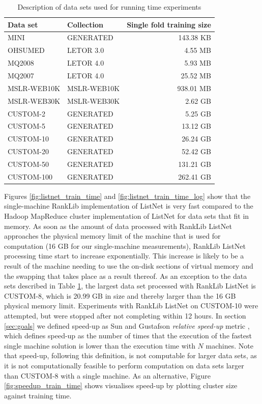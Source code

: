 \begin{table}
\centering
\begin{tabular}{p{3.4cm}p{3.4cm}r}\toprule
Data set & Collection & Single fold training size \\
\midrule
MINI		& GENERATED		  & 143.38 KB\\
OHSUMED     & LETOR 3.0       &   4.55 MB\\
MQ2008      & LETOR 4.0       &   5.93 MB\\
MQ2007      & LETOR 4.0       &  25.52 MB\\
MSLR-WEB10K & MSLR-WEB10K     & 938.01 MB\\
MSLR-WEB30K & MSLR-WEB30K     &   2.62 GB\\
CUSTOM-2	& GENERATED		  &   5.25 GB\\
CUSTOM-5	& GENERATED		  &  13.12 GB\\
CUSTOM-10	& GENERATED		  &  26.24 GB\\
CUSTOM-20   & GENERATED       &  52.42 GB\\
CUSTOM-50	& GENERATED		  & 131.21 GB\\
CUSTOM-100	& GENERATED		  & 262.41 GB\\
\bottomrule
\end{tabular}
\caption{Description of data sets used for running time experiments}
\label{tbl:recap_datasets}
\end{table}

Figures \ref{fig:listnet_train_time} and \ref{fig:listnet_train_time_log} show that the single-machine RankLib implementation of ListNet is very fast compared to the Hadoop MapReduce cluster implementation of ListNet for data sets that fit in memory. As soon as the amount of data processed with RankLib ListNet approaches the physical memory limit of the machine that is used for computation (16 GB for our single-machine measurements), RankLib ListNet processing time start to increase exponentially. This increase is likely to be a result of the machine needing to use the on-disk sections of virtual memory and the swapping that takes place as a result thereof. As an exception to the data sets described in Table \ref{tbl:recap_datasets}, the largest data set processed with RankLib ListNet is CUSTOM-8, which is 20.99 GB in size and thereby larger than the 16 GB physical memory limit. Experiments with RankLib ListNet on CUSTOM-10 were attempted, but were stopped after not completing within 12 hours. In section \ref{sec:goals} we defined speed-up as Sun and Gustafson \emph{relative speed-up} metric \cite{Sun1991}, which defines speed-up as the number of times that the execution of the fastest single machine solution is lower than the execution time with $N$ machines. Note that speed-up, following this definition, is not computable for larger data sets, as it is not computationally feasible to perform computation on data sets larger than CUSTOM-8 with a single machine. As an alternative, Figure \ref{fig:speedup_train_time} shows visualises speed-up by plotting cluster size against training time.\\


